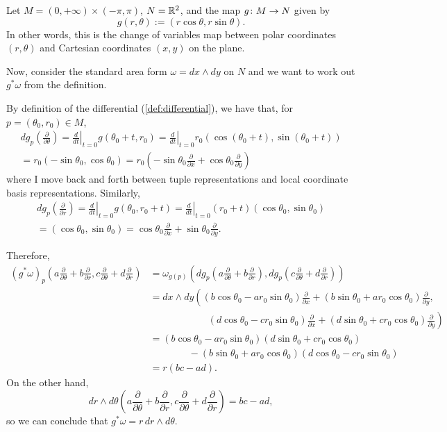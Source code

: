 \begin{example}
	Let $M = (0, +\infty) \times (-\pi, \pi)$, $N = \mathbb{R}^2$, and the map $g\colon\thinspace\! M \to N$ given by
	\[
		g(r, \theta) := (r \cos \theta, r \sin \theta).
	\]
	In other words, this is the change of variables map between polar coordinates $(r, \theta)$ and Cartesian coordinates $(x,y)$ on the plane.
	
	Now, consider the standard area form $\omega = dx \wedge dy$ on $N$ and we want to work out $g^\ast \omega$ from the definition. 
	
	By definition of the differential (\cref{def:differential}), we have that, for $p = (\theta_0, r_0) \in M$, 
	\begin{multline*}
		dg_p\left(\frac{\partial}{\partial \theta} \right) = \left. \frac{d}{dt} \right|_{t=0} g(\theta_0+t,r_0) = \left. \frac{d}{dt} \right|_{t=0} r_0(\cos(\theta_0+t),\sin(\theta_0+t)) \\
		= r_0(-\sin\theta_0,\cos\theta_0) = r_0\left(-\sin\theta_0 \frac{\partial}{\partial x} + \cos \theta_0 \frac{\partial}{\partial y}\right)
	\end{multline*}
	where I move back and forth between tuple representations and local coordinate basis representations. Similarly,
	\begin{multline*}
		dg_p\left(\frac{\partial}{\partial r} \right) = \left. \frac{d}{dt} \right|_{t=0} g(\theta_0,r_0+t) = \left. \frac{d}{dt} \right|_{t=0} (r_0+t)(\cos\theta_0,\sin\theta_0) \\
		= (\cos\theta_0,\sin\theta_0) = \cos\theta_0 \frac{\partial}{\partial x} + \sin \theta_0 \frac{\partial}{\partial y}.
	\end{multline*}
	
	Therefore,
	\begin{align*}
		(g^\ast \omega)_p\left(a \frac{\partial}{\partial \theta} + b \frac{\partial}{\partial r}, c \frac{\partial}{\partial \theta} + d \frac{\partial}{\partial r}\right) & = \omega_{g(p)} \left(dg_p\left(a \frac{\partial}{\partial \theta} + b \frac{\partial}{\partial r}\right), dg_p\left(c \frac{\partial}{\partial \theta} + d \frac{\partial}{\partial r}\right)\right) \\
		& = dx \wedge dy \left((b \cos\theta_0 - a r_0\sin\theta_0) \frac{\partial}{\partial x} + (b\sin \theta_0 +ar_0\cos \theta_0) \frac{\partial}{\partial y}, \right. \\
		& \qquad \qquad \qquad \left. (d \cos\theta_0 - c r_0\sin\theta_0) \frac{\partial}{\partial x} + (d\sin \theta_0 +cr_0\cos \theta_0) \frac{\partial}{\partial y}\right) \\
		& = (b \cos\theta_0 - a r_0\sin\theta_0)(d\sin \theta_0 +cr_0\cos \theta_0) \\
		& \qquad \qquad - (b\sin \theta_0 +ar_0\cos \theta_0)(d \cos\theta_0 - c r_0\sin\theta_0) \\
		& = r(bc-ad).
	\end{align*}
	On the other hand,
	\[
		dr \wedge d\theta \left(a \frac{\partial}{\partial \theta} + b \frac{\partial}{\partial r}, c \frac{\partial}{\partial \theta} + d \frac{\partial}{\partial r}\right) = bc-ad,
	\]
	so we can conclude that $g^\ast \omega = r\, dr \wedge d\theta$.
	

\end{example}
